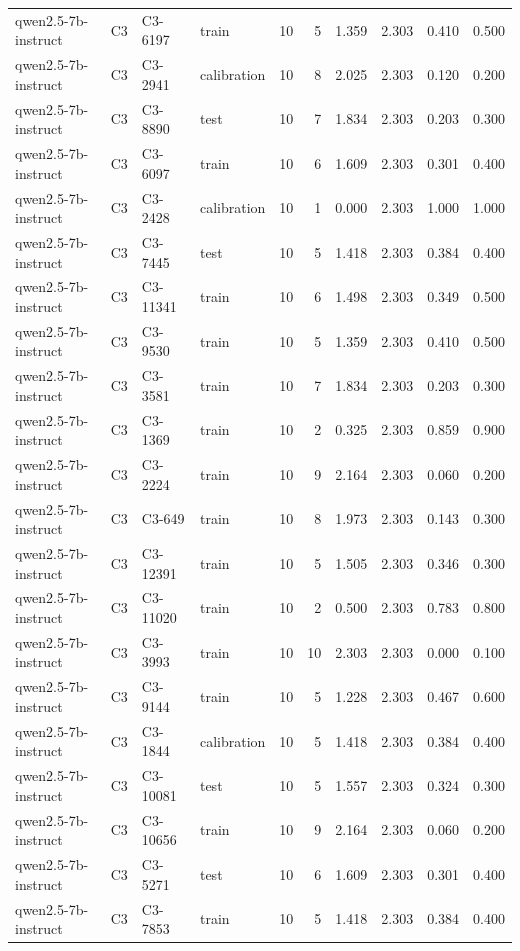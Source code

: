 \begin{table}
\begin{tabular}{llllrrrrrr}
qwen2.5-7b-instruct & C3 & C3-6197 & train & 10 & 5 & 1.359 & 2.303 & 0.410 & 0.500 \\
qwen2.5-7b-instruct & C3 & C3-2941 & calibration & 10 & 8 & 2.025 & 2.303 & 0.120 & 0.200 \\
qwen2.5-7b-instruct & C3 & C3-8890 & test & 10 & 7 & 1.834 & 2.303 & 0.203 & 0.300 \\
qwen2.5-7b-instruct & C3 & C3-6097 & train & 10 & 6 & 1.609 & 2.303 & 0.301 & 0.400 \\
qwen2.5-7b-instruct & C3 & C3-2428 & calibration & 10 & 1 & 0.000 & 2.303 & 1.000 & 1.000 \\
qwen2.5-7b-instruct & C3 & C3-7445 & test & 10 & 5 & 1.418 & 2.303 & 0.384 & 0.400 \\
qwen2.5-7b-instruct & C3 & C3-11341 & train & 10 & 6 & 1.498 & 2.303 & 0.349 & 0.500 \\
qwen2.5-7b-instruct & C3 & C3-9530 & train & 10 & 5 & 1.359 & 2.303 & 0.410 & 0.500 \\
qwen2.5-7b-instruct & C3 & C3-3581 & train & 10 & 7 & 1.834 & 2.303 & 0.203 & 0.300 \\
qwen2.5-7b-instruct & C3 & C3-1369 & train & 10 & 2 & 0.325 & 2.303 & 0.859 & 0.900 \\
qwen2.5-7b-instruct & C3 & C3-2224 & train & 10 & 9 & 2.164 & 2.303 & 0.060 & 0.200 \\
qwen2.5-7b-instruct & C3 & C3-649 & train & 10 & 8 & 1.973 & 2.303 & 0.143 & 0.300 \\
qwen2.5-7b-instruct & C3 & C3-12391 & train & 10 & 5 & 1.505 & 2.303 & 0.346 & 0.300 \\
qwen2.5-7b-instruct & C3 & C3-11020 & train & 10 & 2 & 0.500 & 2.303 & 0.783 & 0.800 \\
qwen2.5-7b-instruct & C3 & C3-3993 & train & 10 & 10 & 2.303 & 2.303 & 0.000 & 0.100 \\
qwen2.5-7b-instruct & C3 & C3-9144 & train & 10 & 5 & 1.228 & 2.303 & 0.467 & 0.600 \\
qwen2.5-7b-instruct & C3 & C3-1844 & calibration & 10 & 5 & 1.418 & 2.303 & 0.384 & 0.400 \\
qwen2.5-7b-instruct & C3 & C3-10081 & test & 10 & 5 & 1.557 & 2.303 & 0.324 & 0.300 \\
qwen2.5-7b-instruct & C3 & C3-10656 & train & 10 & 9 & 2.164 & 2.303 & 0.060 & 0.200 \\
qwen2.5-7b-instruct & C3 & C3-5271 & test & 10 & 6 & 1.609 & 2.303 & 0.301 & 0.400 \\
qwen2.5-7b-instruct & C3 & C3-7853 & train & 10 & 5 & 1.418 & 2.303 & 0.384 & 0.400 \\

\end{tabular}
\end{table}
